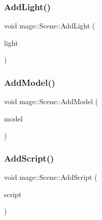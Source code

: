 \hypertarget{classmage_1_1_scene_aeeba74ee789d4917ed72b179f16c1222}{}\label{classmage_1_1_scene_aeeba74ee789d4917ed72b179f16c1222} 
\subsubsection{\texorpdfstring{Add\+Light()}{AddLight()}\hspace{0.1cm}{\footnotesize\ttfamily [2/2]}}
{\footnotesize\ttfamily void mage\+::\+Scene\+::\+Add\+Light (\begin{DoxyParamCaption}\item[{\hyperlink{namespacemage_a1e01ae66713838a7a67d30e44c67703e}{Shared\+Ptr}$<$ \hyperlink{namespacemage_aeed5dee4ff6c591eabb0e9114256df4a}{Spot\+Light\+Node} $>$}]{light }\end{DoxyParamCaption})\hspace{0.3cm}{\ttfamily [private]}}

\hypertarget{classmage_1_1_scene_acfd5cf0484e1814cb265604ed970335f}{}\label{classmage_1_1_scene_acfd5cf0484e1814cb265604ed970335f} 
\subsubsection{\texorpdfstring{Add\+Model()}{AddModel()}}
{\footnotesize\ttfamily void mage\+::\+Scene\+::\+Add\+Model (\begin{DoxyParamCaption}\item[{\hyperlink{namespacemage_a1e01ae66713838a7a67d30e44c67703e}{Shared\+Ptr}$<$ \hyperlink{classmage_1_1_model_node}{Model\+Node} $>$}]{model }\end{DoxyParamCaption})\hspace{0.3cm}{\ttfamily [private]}}

\hypertarget{classmage_1_1_scene_ab97b66c81c32681699052e154d0e0722}{}\label{classmage_1_1_scene_ab97b66c81c32681699052e154d0e0722} 
\subsubsection{\texorpdfstring{Add\+Script()}{AddScript()}}
{\footnotesize\ttfamily void mage\+::\+Scene\+::\+Add\+Script (\begin{DoxyParamCaption}\item[{\hyperlink{namespacemage_a1e01ae66713838a7a67d30e44c67703e}{Shared\+Ptr}$<$ \hyperlink{classmage_1_1_behavior_script}{Behavior\+Script} $>$}]{script }\end{DoxyParamCaption})}

